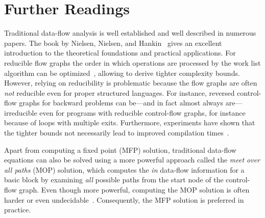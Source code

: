 \section{Further Readings}
\label{novillo:sec:further_reading}

Traditional data-flow analysis is well established and well described in numerous papers. 
The book by Nielsen, Nielsen, and Hankin~\cite{novillo:bib:NNH99} gives an excellent introduction to the theoretical foundations and practical applications. 
For reducible flow graphs the order in which operations are processed by the work list algorithm can be optimized~\cite{novillo:bib:HU73,novillo:bib:KU76,novillo:bib:NNH99}, allowing to derive tighter complexity bounds. 
However, relying on reducibility is problematic because the flow graphs are often \emph{not} reducible even for proper structured languages. 
For instance, reversed control-flow graphs for backward problems can be---and in fact almost always are---irreducible even for programs with reducible control-flow graphs, for instance because of loops with multiple exits. 
Furthermore, experiments have shown that the tighter bounds not necessarily lead to improved compilation times~\cite{novillo:bib:CTK06}.

Apart from computing a fixed point (MFP) solution, traditional data-flow equations can also be solved using a more powerful approach called the \emph{meet over all paths} (MOP) solution, which computes the \emph{in} data-flow information for a basic block by examining \emph{all} possible paths from the start node of the control-flow graph. 
Even though more powerful, computing the MOP solution is often harder or even undecidable~\cite{novillo:bib:NNH99}. 
Consequently, the MFP solution is preferred in practice.


